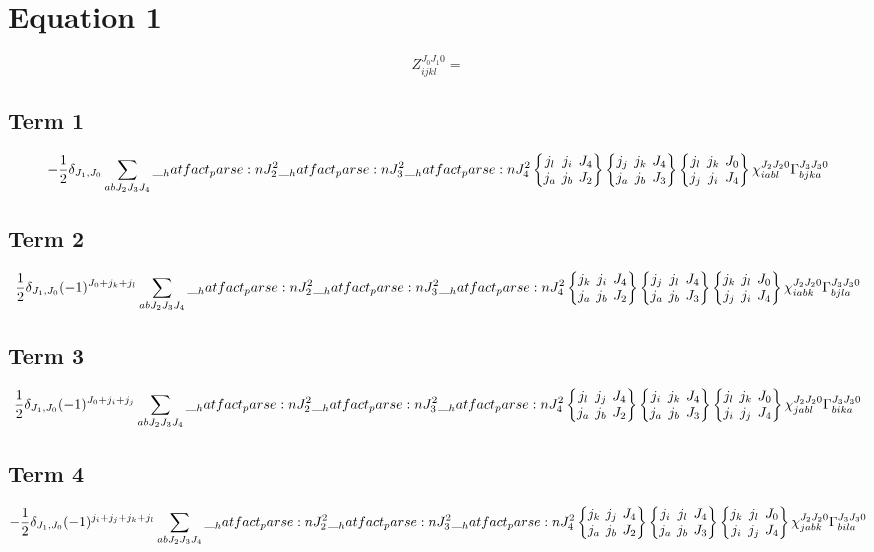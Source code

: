 \documentclass{scrartcl}
\newcommand{\sixj}[6]{\begingroup\setlength{\arraycolsep}{0.2em}\begin{Bmatrix} #1 & #2 & #3 \\ #4 & #5 & #6 \end{Bmatrix}\endgroup}
\begin{document}
\section{Equation 1}
\begin{dmath*}
Z_{i j k l}^{{J}_{0} {J}_{1} 0} = 
\end{dmath*}
\subsection{Term 1}
\begin{dmath*}
-\frac{1}{2} \* \delta_{{J}_{1},{J}_{0}} \* \sum_{a b {J}_{2} {J}_{3} {J}_{4}} \* \hatfact{{J}_{2}^{2}} \* \hatfact{{J}_{3}^{2}} \* \hatfact{{J}_{4}^{2}} \* \sixj{{j}_{l}}{{j}_{i}}{{J}_{4}}{{j}_{a}}{{j}_{b}}{{J}_{2}} \* \sixj{{j}_{j}}{{j}_{k}}{{J}_{4}}{{j}_{a}}{{j}_{b}}{{J}_{3}} \* \sixj{{j}_{l}}{{j}_{k}}{{J}_{0}}{{j}_{j}}{{j}_{i}}{{J}_{4}} \* \chi_{i a b l}^{{J}_{2} {J}_{2} 0} \* \Gamma_{b j k a}^{{J}_{3} {J}_{3} 0}
\end{dmath*}
\subsection{Term 2}
\begin{dmath*}
\frac{1}{2} \* \delta_{{J}_{1},{J}_{0}} \* (-1)^{{J}_{0}+{j}_{k}+{j}_{l}} \* \sum_{a b {J}_{2} {J}_{3} {J}_{4}} \* \hatfact{{J}_{2}^{2}} \* \hatfact{{J}_{3}^{2}} \* \hatfact{{J}_{4}^{2}} \* \sixj{{j}_{k}}{{j}_{i}}{{J}_{4}}{{j}_{a}}{{j}_{b}}{{J}_{2}} \* \sixj{{j}_{j}}{{j}_{l}}{{J}_{4}}{{j}_{a}}{{j}_{b}}{{J}_{3}} \* \sixj{{j}_{k}}{{j}_{l}}{{J}_{0}}{{j}_{j}}{{j}_{i}}{{J}_{4}} \* \chi_{i a b k}^{{J}_{2} {J}_{2} 0} \* \Gamma_{b j l a}^{{J}_{3} {J}_{3} 0}
\end{dmath*}
\subsection{Term 3}
\begin{dmath*}
\frac{1}{2} \* \delta_{{J}_{1},{J}_{0}} \* (-1)^{{J}_{0}+{j}_{i}+{j}_{j}} \* \sum_{a b {J}_{2} {J}_{3} {J}_{4}} \* \hatfact{{J}_{2}^{2}} \* \hatfact{{J}_{3}^{2}} \* \hatfact{{J}_{4}^{2}} \* \sixj{{j}_{l}}{{j}_{j}}{{J}_{4}}{{j}_{a}}{{j}_{b}}{{J}_{2}} \* \sixj{{j}_{i}}{{j}_{k}}{{J}_{4}}{{j}_{a}}{{j}_{b}}{{J}_{3}} \* \sixj{{j}_{l}}{{j}_{k}}{{J}_{0}}{{j}_{i}}{{j}_{j}}{{J}_{4}} \* \chi_{j a b l}^{{J}_{2} {J}_{2} 0} \* \Gamma_{b i k a}^{{J}_{3} {J}_{3} 0}
\end{dmath*}
\subsection{Term 4}
\begin{dmath*}
-\frac{1}{2} \* \delta_{{J}_{1},{J}_{0}} \* (-1)^{{j}_{i}+{j}_{j}+{j}_{k}+{j}_{l}} \* \sum_{a b {J}_{2} {J}_{3} {J}_{4}} \* \hatfact{{J}_{2}^{2}} \* \hatfact{{J}_{3}^{2}} \* \hatfact{{J}_{4}^{2}} \* \sixj{{j}_{k}}{{j}_{j}}{{J}_{4}}{{j}_{a}}{{j}_{b}}{{J}_{2}} \* \sixj{{j}_{i}}{{j}_{l}}{{J}_{4}}{{j}_{a}}{{j}_{b}}{{J}_{3}} \* \sixj{{j}_{k}}{{j}_{l}}{{J}_{0}}{{j}_{i}}{{j}_{j}}{{J}_{4}} \* \chi_{j a b k}^{{J}_{2} {J}_{2} 0} \* \Gamma_{b i l a}^{{J}_{3} {J}_{3} 0}
\end{dmath*}
\end{document}
